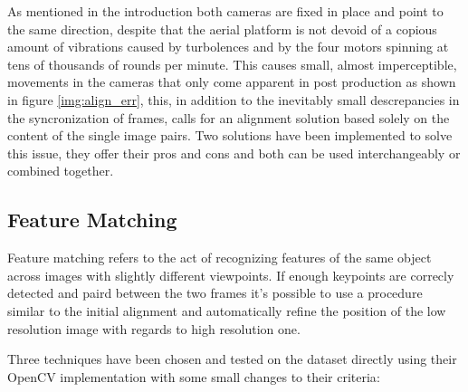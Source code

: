 As mentioned in the introduction both cameras are fixed in place and point to the same direction, despite that the aerial platform is not devoid of a copious amount of vibrations caused by turbolences and by the four motors spinning at tens of thousands of rounds per minute.
This causes small, almost imperceptible, movements in the cameras that only come apparent in post production as shown in figure \ref{img:align_err}, this, in addition to the inevitably small descrepancies in the syncronization of frames, calls for an alignment solution based solely on the content of the single image pairs. Two solutions have been implemented to solve this issue, they offer their pros and cons and both can be used interchangeably or combined together.


\subsection {Feature Matching}
\label{subsec:feature_match}

Feature matching refers to the act of recognizing features of the same object across images with slightly different viewpoints\cite{feat_match}. If enough keypoints are correcly detected and paird between the two frames it's possible to use a procedure similar to the initial alignment and automatically refine the position of the low resolution image with regards to high resolution one.

Three techniques have been chosen and tested on the dataset directly using their OpenCV implementation with some small changes to their criteria\cite{6126544}\cite{lowe1999object}\cite{6809191}\cite{DBLP:journals/corr/abs-1710-02726}:

